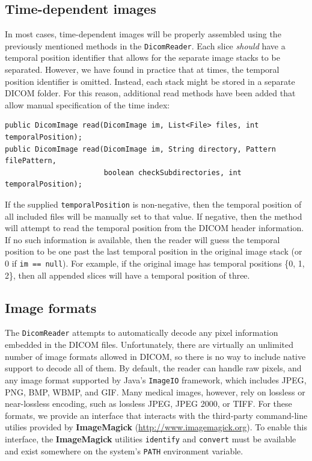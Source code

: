 \subsection{Time-dependent images}

In most cases, time-dependent images will be properly assembled using the previously mentioned
methods in the \lstinline{DicomReader}.  Each slice \emph{should} have a temporal position
identifier that allows for the separate image stacks to be separated.  However, we have found
in practice that at times, the temporal position identifier is omitted.  Instead, each stack
might be stored in a separate DICOM folder.  For this reason, additional read methods have
been added that allow manual specification of the time index:
\begin{lstlisting}[]
public DicomImage read(DicomImage im, List<File> files, int temporalPosition);
public DicomImage read(DicomImage im, String directory, Pattern filePattern, 
                       boolean checkSubdirectories, int temporalPosition);
\end{lstlisting}
If the supplied \lstinline{temporalPosition} is non-negative, then the temporal
position of all included files will be manually set to that value.  If negative,
then the method will attempt to read the temporal position from the DICOM header
information.  If no such information is available, then the reader will guess the 
temporal position to be one past the last temporal position in the original image
stack (or 0 if \lstinline{im == null}).  For example, if the original
image has temporal positions \{0, 1, 2\}, then all appended slices will have
a temporal position of three.

\subsection{Image formats \label{sec:dicom:formats}}

The \lstinline{DicomReader} attempts to automatically decode any pixel information 
embedded in the DICOM files.  Unfortunately, there are virtually an unlimited number
of image formats allowed in DICOM, so there is no way to include native
support to decode all of them.  By default, the reader can handle raw pixels,
and any image format supported by Java's \lstinline{ImageIO} framework,
which includes JPEG, PNG, BMP, WBMP, and GIF.  Many medical images, however,
rely on lossless or near-lossless encoding, such as lossless JPEG, JPEG 2000, or TIFF.
For these formats, we provide an interface that interacts with the third-party
command-line utilies provided by \textbf{ImageMagick} (\url{http://www.imagemagick.org}).
To enable this interface, the \textbf{ImageMagick} utilities \texttt{identify} and 
\texttt{convert} must be available and exist somewhere on the system's \texttt{PATH}
environment variable.

